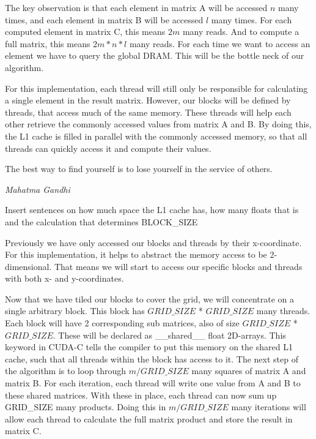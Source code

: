 The key observation is that each element in matrix A will be accessed $n$ many times, and each element in matrix B will be accessed $l$ many times. For each computed element in matrix C, this means $2m$ many reads. And to compute a full matrix, this means $2m * n * l$ many reads. For each time we want to access an element we have to query the global DRAM. This will be the bottle neck of our algorithm. 

For this implementation, each thread will still only be responsible for calculating a single element in the result matrix. However, our blocks will be defined by threads, that access much of the same memory. These threads will help each other retrieve the commonly accessed values from matrix A and B. By doing this, the L1 cache is filled in parallel with the commonly accessed memory, so that all threads can quickly access it and compute their values. 

\epigraph{The best way to find yourself is to lose yourself in the service of others.}{\textit{Mahatma Gandhi}}

Insert sentences on how much space the L1 cache has, how many floats that is and the calculation that determines BLOCK\_SIZE

Previously we have only accessed our blocks and threads by their x-coordinate. For this implementation, it helps to abstract the memory access to be 2-dimensional. That means we will start to access our specific blocks and threads with both x- and y-coordinates. 

Now that we have tiled our blocks to cover the grid, we will concentrate on a single arbitrary block. This block has $GRID\_SIZE$ * $GRID\_SIZE$ many threads. Each block will have 2 corresponding sub matrices, also of size $GRID\_SIZE$ * $GRID\_SIZE$. These will be declared as \_\_shared\_\_ float 2D-arrays. This keyword in CUDA-C tells the compiler to put this memory on the shared L1 cache, such that all threads within the block has access to it. 
The next step of the algorithm is to loop through $m / GRID\_SIZE$ many squares of matrix A and matrix B. For each iteration, each thread will write one value from A and B to these shared matrices. With these in place, each thread can now sum up GRID\_SIZE many products. Doing this in $m / GRID\_SIZE$ many iterations will allow each thread to calculate the full matrix product and store the result in matrix C. 

